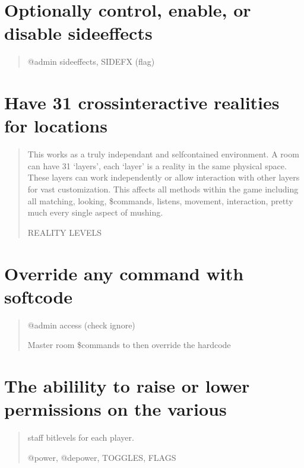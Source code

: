 \documentclass[letterpaper,10pt,english]{sphinxmanual}
\begin{document}
\section{Optionally control, enable, or disable sideeffects}
\label{\detokenize{features:optionally-control-enable-or-disable-sideeffects}}\begin{quote}

\sphinxAtStartPar
@admin sideeffects, SIDEFX (flag)
\end{quote}


\section{Have 31 cross\sphinxhyphen{}interactive realities for locations}
\label{\detokenize{features:have-31-cross-interactive-realities-for-locations}}\begin{quote}

\sphinxAtStartPar
This works as a truly independant and self\sphinxhyphen{}contained environment.
A room can have 31 ‘layers’, each ‘layer’ is a reality in
the same physical space.  These layers can work independently
or allow interaction with other layers for vast customization.
This affects all methods within the game including all matching,
looking, \$commands, listens, movement, interaction, pretty
much every single aspect of mushing.

\sphinxAtStartPar
REALITY LEVELS
\end{quote}


\section{Override any command with softcode}
\label{\detokenize{features:override-any-command-with-softcode}}\begin{quote}

\sphinxAtStartPar
@admin access (check ignore)

\sphinxAtStartPar
Master room \$commands to then override the hardcode
\end{quote}


\section{The abilility to raise or lower permissions on the various}
\label{\detokenize{features:the-abilility-to-raise-or-lower-permissions-on-the-various}}\begin{quote}

\sphinxAtStartPar
staff bitlevels for each player.

\sphinxAtStartPar
@power, @depower, TOGGLES, FLAGS
\end{quote}
\end{document}
